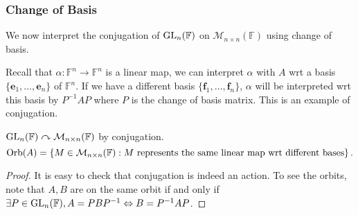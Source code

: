 \documentclass[a4paper]{article}
\begin{document}
    \subsubsection{Change of Basis}
    We now interpret the conjugation of $ \mathrm{GL}_n(\mathbb{F}) $ on $ \mathcal{M}_{n\times n}(\mathbb{F}) $ using change of basis.

    Recall that $ \alpha: \mathbb{F}^n \to \mathbb{F}^n $ is a linear map, we can interpret $\alpha$ with $A$ wrt a basis $ \{\mathbf{e}_1,\dots,\mathbf{e}_n\} $ of $ \mathbb{F}^n $. If we have a different basis $ \{\mathbf{f}_1,\dots,\mathbf{f}_n\} $, $\alpha$ will be interpreted wrt this basis by $ P^{-1}AP $ where $P$ is the change of basis matrix. This is an example of conjugation.
    \begin{proposition}\label{prop:7.9}
        $ \mathrm{GL}_n(\mathbb{F}) \curvearrowright \mathcal{M}_{n\times n}(\mathbb{F}) $ by conjugation. 
        \[
            \operatorname{Orb}(A)=\left\{ M\in \mathcal{M}_{n\times n}(\mathbb{F}): M \text{ represents the same linear map wrt different bases} \right\}.
        \]
    \end{proposition}
    \begin{proof}
        It is easy to check that conjugation is indeed an action. To see the orbits, note that $ A,B $ are on the same orbit if and only if $ \exists P\in \mathrm{GL}_n(\mathbb{F}), A = PBP^{-1} \Leftrightarrow B=P^{-1}AP $.
    \end{proof}
\end{document}
